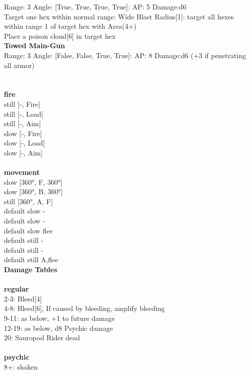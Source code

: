 Range: 3  Angle: [True, True, True, True]: AP: 5 Damage:d6 \\
Target one hex within normal range: Wide Blast Radius[1]: target all hexes within range 1 of target hex with Area(4+)\\ 
Place a poison cloud[6] in target hex\\ 




{\bf Towed Main-Gun } \\



Range: 3  Angle: [False, False, True, True]: AP: 8 Damage:d6 (+3 if penetrating all armor) \\




 
\ \\



\ \\ {\bf fire } \\
still [-, Fire] \\
still [-, Load] \\
still [-, Aim] \\
slow [-, Fire] \\
slow [-, Load] \\
slow [-, Aim] \\
\ \\ {\bf movement } \\
slow [360°, F, 360°] \\
slow [360°, B, 360°] \\
still [360°, A, F] \\
default slow - \\
default slow - \\
default slow flee \\
default still - \\
default still - \\
default still A,flee \\


{\bf Damage Tables} \\
\ \\ {\bf regular } \\
2-3: Bleed[4] \\
4-8: Bleed[6], If caused by bleeding, amplify bleeding \\
9-11: as below, +1 to future damage \\
12-19: as below, d8 Psychic damage \\
20: Sauropod Rider dead \\
\ \\ {\bf psychic } \\
8+: shaken \\










